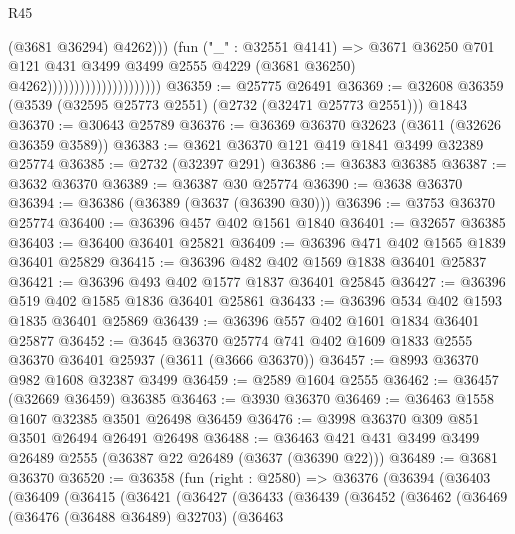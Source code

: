 \begin{lexlean}{R45}
\begin{coremodule}
                                                  (@3681 @36294)
                                                  @4262)))
                                            (fun ("_" : @32551 @4141) =>
                                            @3671
                                              @36250
                                              @701
                                              @121
                                              @431
                                              @3499
                                              @3499
                                              @2555
                                              @4229
                                              (@3681 @36250)
                                              @4262)))))))))))))))))))))
@36359 := @25775 @26491
@36369 := @32608 @36359 (@3539 (@32595 @25773 @2551) (@2732 (@32471 @25773 @2551))) @1843
@36370 := @30643 @25789
@36376 := @36369 @36370 @32623 (@3611 (@32626 @36359 @3589))
@36383 := @3621 @36370 @121 @419 @1841 @3499 @32389 @25774
@36385 := @2732 (@32397 @291)
@36386 := @36383 @36385
@36387 := @3632 @36370
@36389 := @36387 @30 @25774
@36390 := @3638 @36370
@36394 := @36386 (@36389 (@3637 (@36390 @30)))
@36396 := @3753 @36370 @25774
@36400 := @36396 @457 @402 @1561 @1840
@36401 := @32657 @36385
@36403 := @36400 @36401 @25821
@36409 := @36396 @471 @402 @1565 @1839 @36401 @25829
@36415 := @36396 @482 @402 @1569 @1838 @36401 @25837
@36421 := @36396 @493 @402 @1577 @1837 @36401 @25845
@36427 := @36396 @519 @402 @1585 @1836 @36401 @25861
@36433 := @36396 @534 @402 @1593 @1835 @36401 @25869
@36439 := @36396 @557 @402 @1601 @1834 @36401 @25877
@36452 := @3645
    @36370
    @25774
    @741
    @402
    @1609
    @1833
    @2555
    @36370
    @36401
    @25937
    (@3611 (@3666 @36370))
@36457 := @8993 @36370 @982 @1608 @32387 @3499
@36459 := @2589 @1604 @2555
@36462 := @36457 (@32669 @36459) @36385
@36463 := @3930 @36370
@36469 := @36463 @1558 @1607 @32385 @3501 @26498 @36459
@36476 := @3998 @36370 @309 @851 @3501 @26494 @26491 @26498
@36488 := @36463 @421 @431 @3499 @3499 @26489 @2555 (@36387 @22 @26489 (@3637 (@36390 @22)))
@36489 := @3681 @36370
@36520 := @36358
    (fun (right : @2580) =>
    @36376
      (@36394
        (@36403
          (@36409
            (@36415
              (@36421
                (@36427
                  (@36433
                    (@36439
                      (@36452
                        (@36462
                          (@36469
                            (@36476 (@36488 @36489) @32703)
                            (@36463

\end{coremodule}
\end{lexlean}
